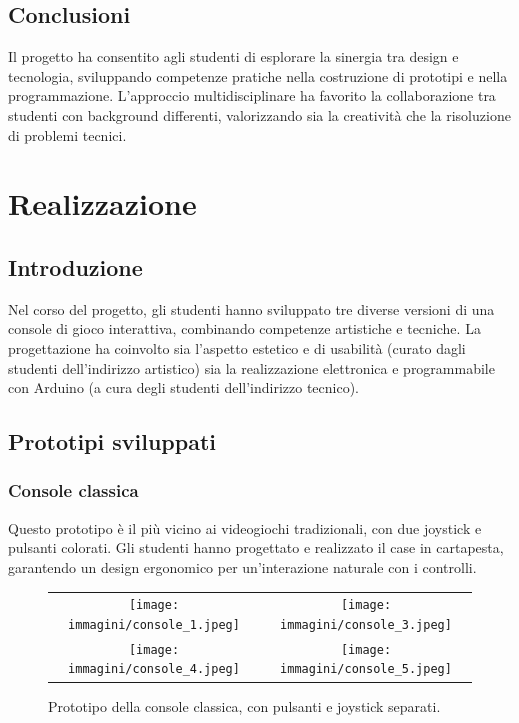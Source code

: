 \documentclass[a4paper,12pt]{report}
\begin{document}
\section{Conclusioni}
Il progetto ha consentito agli studenti di esplorare la sinergia tra design e tecnologia, sviluppando competenze pratiche nella costruzione di prototipi e nella programmazione. L'approccio multidisciplinare ha favorito la collaborazione tra studenti con background differenti, valorizzando sia la creatività che la risoluzione di problemi tecnici.




\chapter{Realizzazione}

\section{Introduzione}
Nel corso del progetto, gli studenti hanno sviluppato tre diverse versioni di una console di gioco interattiva, combinando competenze artistiche e tecniche. La progettazione ha coinvolto sia l'aspetto estetico e di usabilità (curato dagli studenti dell'indirizzo artistico) sia la realizzazione elettronica e programmabile con Arduino (a cura degli studenti dell'indirizzo tecnico).

\section{Prototipi sviluppati}

\subsection{Console classica}
Questo prototipo è il più vicino ai videogiochi tradizionali, con due joystick e pulsanti colorati. Gli studenti hanno progettato e realizzato il case in cartapesta, garantendo un design ergonomico per un'interazione naturale con i controlli.

\begin{figure}[h]
    \centering
    \begin{tabular}{c c}
        \texttt{[image: immagini/console\_1.jpeg]} &
        \texttt{[image: immagini/console\_3.jpeg]} \\
        \texttt{[image: immagini/console\_4.jpeg]} &
        \texttt{[image: immagini/console\_5.jpeg]} \\
    \end{tabular}
    \caption{Prototipo della console classica, con pulsanti e joystick separati.}
    \label{fig:console_classica}
\end{figure}
\end{document}
